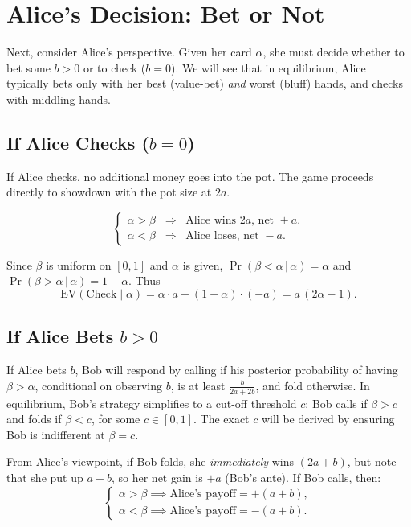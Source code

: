 \documentclass{article}
\begin{document}
\section{Alice's Decision: Bet or Not}

Next, consider Alice's perspective.  Given her card $\alpha$, she must decide whether to bet some $b>0$ or to check ($b=0$).  We will see that in equilibrium, Alice typically bets only with her best (value-bet) \emph{and} worst (bluff) hands, and checks with middling hands.

\subsection{If Alice Checks ($b=0$)}

If Alice checks, no additional money goes into the pot.  The game proceeds directly to showdown with the pot size at $2a$.  

\[
\begin{cases}
\alpha > \beta \;\;\Longrightarrow\;\; \text{Alice wins }2a \text{, net }+a.\\
\alpha < \beta \;\;\Longrightarrow\;\; \text{Alice loses, net }-a.
\end{cases}
\]


Since $\beta$ is uniform on $[0,1]$ and $\alpha$ is given, $\Pr(\beta < \alpha \, | \, \alpha) = \alpha$ and $\Pr(\beta > \alpha \, | \, \alpha) = 1-\alpha$.  Thus
\[
\text{EV}(\text{Check}\mid \alpha)
= \alpha \cdot a + (1-\alpha)\cdot (-a) 
= a\,(2\alpha - 1).
\]


\subsection{If Alice Bets $b > 0$}

If Alice bets $b$, Bob will respond by calling if his posterior probability of having $\beta > \alpha$, conditional on observing $b$, is at least $\frac{b}{2a + 2b}$, and fold otherwise. In equilibrium, Bob's strategy simplifies to a cut-off threshold $c$: Bob calls if $\beta > c$ and folds if $\beta < c$, for some $c \in [0,1]$. The exact $c$ will be derived by ensuring Bob is indifferent at $\beta = c$.

From Alice's viewpoint, if Bob folds, she \emph{immediately} wins $(2a + b)$, but note that she put up $a+b$, so her net gain is $+a$ (Bob's ante). If Bob calls, then:
\[
\begin{cases}
\alpha > \beta \implies \text{Alice's payoff} = +(a + b),\\
\alpha < \beta \implies \text{Alice's payoff} = -(a + b).
\end{cases}
\]
\end{document}
